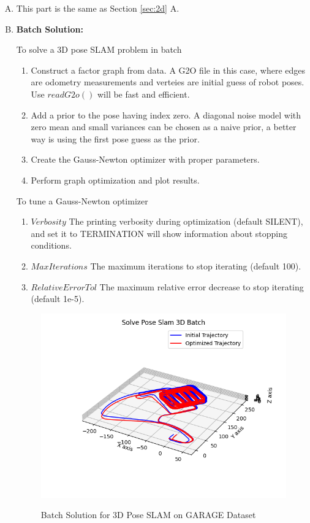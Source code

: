\documentclass[11pt, oneside, letter]{article}
\begin{document}
\begin{enumerate}[A.]

\item This part is the same as Section \ref{sec:2d} A.

\item \textbf{Batch Solution:}

To solve a 3D pose SLAM problem in batch
\begin{enumerate}[1.]
    \item Construct a factor graph from data. A G2O file in this case, where edges are odometry measurements and verteies are initial guess of robot poses. Use $readG2o()$ will be fast and efficient.
    \item Add a prior to the pose having index zero. A diagonal noise model with zero mean and small variances can be chosen as a naive prior, a better way is using the first pose guess as the prior.
    \item Create the Gauss-Newton optimizer with proper parameters.
    \item Perform graph optimization and plot results.
\end{enumerate}

To tune a Gauss-Newton optimizer
\begin{enumerate}[1.]
    \item $Verbosity$ The printing verbosity during optimization (default SILENT), and set it to TERMINATION will show information about stopping conditions.
    \item $MaxIterations$ The maximum iterations to stop iterating (default 100).
    \item $RelativeErrorTol$ The maximum relative error decrease to stop iterating (default 1e-5).
\end{enumerate}

\begin{figure}[H]
    \centering
        \textsf{\includegraphics[width=0.65\columnwidth]{../figures/solve_pose_slam_3d_batch.png}}
        \caption{Batch Solution for 3D Pose SLAM on GARAGE Dataset}
        \label{fig:solve_pose_slam_3d_batch}
\end{figure}


\end{enumerate}
\end{document}

